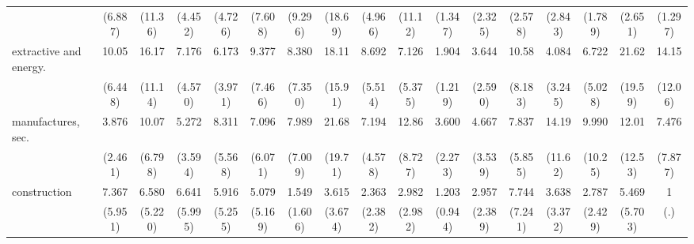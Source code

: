 {\begin{tabular}{l*{16}{c}}
                    &     (6.887)         &     (11.36)         &     (4.452)         &     (4.726)         &     (7.608)         &     (9.296)         &     (18.69)         &     (4.966)         &     (11.12)         &     (1.347)         &     (2.325)         &     (2.578)         &     (2.843)         &     (1.789)         &     (2.651)         &     (1.297)         \\
[1em]
extractive and energy.&       10.05\sym{***}&       16.17\sym{***}&       7.176\sym{**} &       6.173\sym{**} &       9.377\sym{**} &       8.380\sym{*}  &       18.11\sym{***}&       8.692\sym{***}&       7.126\sym{**} &       1.904         &       3.644         &       10.58\sym{**} &       4.084         &       6.722\sym{*}  &       21.62\sym{***}&       14.15\sym{**} \\
                    &     (6.448)         &     (11.14)         &     (4.570)         &     (3.971)         &     (7.466)         &     (7.350)         &     (15.91)         &     (5.514)         &     (5.375)         &     (1.219)         &     (2.590)         &     (8.183)         &     (3.245)         &     (5.028)         &     (19.59)         &     (12.06)         \\
[1em]
manufactures, sec.  &       3.876\sym{*}  &       10.07\sym{***}&       5.272\sym{*}  &       8.311\sym{**} &       7.096\sym{*}  &       7.989\sym{*}  &       21.68\sym{***}&       7.194\sym{**} &       12.86\sym{***}&       3.600\sym{*}  &       4.667\sym{*}  &       7.837\sym{**} &       14.19\sym{**} &       9.990\sym{*}  &       12.01\sym{*}  &       7.476         \\
                    &     (2.461)         &     (6.798)         &     (3.594)         &     (5.568)         &     (6.071)         &     (7.009)         &     (19.71)         &     (4.578)         &     (8.727)         &     (2.273)         &     (3.539)         &     (5.855)         &     (11.62)         &     (10.25)         &     (12.53)         &     (7.877)         \\
[1em]
construction        &       7.367\sym{*}  &       6.580\sym{*}  &       6.641\sym{*}  &       5.916\sym{*}  &       5.079         &       1.549         &       3.615         &       2.363         &       2.982         &       1.203         &       2.957         &       7.744\sym{*}  &       3.638         &       2.787         &       5.469         &           1         \\
                    &     (5.951)         &     (5.220)         &     (5.995)         &     (5.255)         &     (5.169)         &     (1.606)         &     (3.674)         &     (2.382)         &     (2.982)         &     (0.944)         &     (2.389)         &     (7.241)         &     (3.372)         &     (2.429)         &     (5.703)         &         (.)         \\

\end{tabular}}
